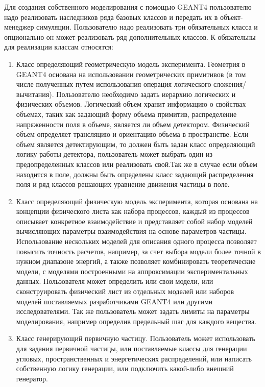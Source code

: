 Для создания собственного моделирования с помощью GEANT4 пользователю надо реализовать наследников ряда базовых классов и передать их в объект-менеджер симуляции. Пользователю надо реализовать три обязательных класса и опционально он может реализовать ряд дополнительных классов. К обязательны для реализации классам относятся: 
\begin{enumerate}
    \item  Класс определяющий геометрическую модель эксперимента. Геометрия в GEANT4 основана на использовании геометрических примитивов (в том числе полученных путем использования операция логического сложения/вычитания). Пользователю необходимо задать иерархию логических и физических объемов. Логический объем хранит информацию о свойствах объемах, таких как задающий форму объема примитив, распределение напряженности поля в объеме, является ли объем детектором. Физический объем определяет трансляцию и ориентацию объема в пространстве. Если объем является детектирующим, то должен быть задан класс определяющий логику работы детектора, пользователь может выбрать один из предопределенных классов или реализовать свой.Так же в случае если объем находится в поле, должны быть определены класс задающий распределения поля и ряд классов решающих уравнение движения частицы в поле.
    \item Класс определяющий физическую модель эксперимента, которая основана на концепции физического листа как набора процессов, каждый  из процессов описывает конкретное взаимодействие и представляет собой набор моделей вычисляющих параметры взаимодействия на основе параметров частицы. Использование нескольких моделей для описания одного процесса позволяет повысить точность расчетов, например, за счет выбора модели более точной в нужном диапазоне энергий, а также позволяет комбинировать теоретические модели, с моделями построенными на аппроксимации экспериментальных данных. Пользователя может определить или свои модели, или сконструировать физический лист из отдельных моделей или наборов моделей поставляемых разработчиками GEANT4 или другими исследователями. Так же пользователь может задать лимиты на параметры моделирования, например определив предельный шаг для каждого вещества.
    \item Класс генерирующий первичную частицу. Пользователь может использовать для задания первичной частицы, или поставляемые классы для генерации угловых, пространственных и энергетических распределений, или написать собственную логику генерации, или подключить какой-либо внешний генератор.  
\end{enumerate}
